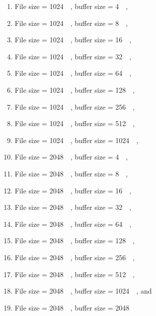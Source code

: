 \begin{enumerate}
	\item File size = \SI{1024}{\kilo\byte}, buffer size = \SI{4}{\kilo\byte},
	\item File size = \SI{1024}{\kilo\byte}, buffer size = \SI{8}{\kilo\byte},
	\item File size = \SI{1024}{\kilo\byte}, buffer size = \SI{16}{\kilo\byte},
	\item File size = \SI{1024}{\kilo\byte}, buffer size = \SI{32}{\kilo\byte},
	\item File size = \SI{1024}{\kilo\byte}, buffer size = \SI{64}{\kilo\byte},
	\item File size = \SI{1024}{\kilo\byte}, buffer size = \SI{128}{\kilo\byte},
	\item File size = \SI{1024}{\kilo\byte}, buffer size = \SI{256}{\kilo\byte},
	\item File size = \SI{1024}{\kilo\byte}, buffer size = \SI{512}{\kilo\byte},
	\item File size = \SI{1024}{\kilo\byte}, buffer size = \SI{1024}{\kilo\byte},
	\item File size = \SI{2048}{\kilo\byte}, buffer size = \SI{4}{\kilo\byte},
	\item File size = \SI{2048}{\kilo\byte}, buffer size = \SI{8}{\kilo\byte},
	\item File size = \SI{2048}{\kilo\byte}, buffer size = \SI{16}{\kilo\byte},
	\item File size = \SI{2048}{\kilo\byte}, buffer size = \SI{32}{\kilo\byte},
	\item File size = \SI{2048}{\kilo\byte}, buffer size = \SI{64}{\kilo\byte},
	\item File size = \SI{2048}{\kilo\byte}, buffer size = \SI{128}{\kilo\byte},
	\item File size = \SI{2048}{\kilo\byte}, buffer size = \SI{256}{\kilo\byte},
	\item File size = \SI{2048}{\kilo\byte}, buffer size = \SI{512}{\kilo\byte},
	\item File size = \SI{2048}{\kilo\byte}, buffer size = \SI{1024}{\kilo\byte}, and
	\item File size = \SI{2048}{\kilo\byte}, buffer size = \SI{2048}{\kilo\byte}
\end{enumerate}

